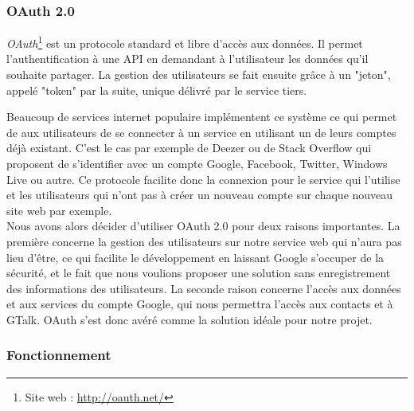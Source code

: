\subsubsection{OAuth 2.0}

\textit{OAuth}\footnote{Site web : \href{http://oauth.net/}{http://oauth.net/}} est un protocole standard et libre d'accès aux données.
Il permet l'authentification à une API en demandant à l'utilisateur les données qu'il souhaite partager.
La gestion des utilisateurs se fait ensuite grâce à un "jeton", appelé "token" par la suite, unique délivré par le service tiers.

Beaucoup de services internet populaire implémentent ce système ce qui permet de aux utilisateurs de se connecter à un service en utilisant un de leurs comptes déjà existant.
C'est le cas par exemple de Deezer ou de Stack Overflow qui proposent de s'identifier avec un compte Google, Facebook, Twitter, Windows Live ou autre.
Ce protocole facilite donc la connexion pour le service qui l'utilise et les utilisateurs qui n'ont pas 
à créer un nouveau compte sur chaque nouveau site web par exemple.
\\


Nous avons alors décider d'utiliser OAuth 2.0 pour deux raisons importantes.
La première concerne la gestion des utilisateurs sur notre service web qui n'aura pas lieu d'être, ce qui facilite le développement en laissant Google s'occuper de la sécurité, et le fait que nous voulions proposer une solution sans enregistrement des informations des utilisateurs.
La seconde raison concerne l'accès aux données et aux services du compte Google, qui nous permettra l'accès aux contacts et à GTalk.
OAuth s'est donc avéré comme la solution idéale pour notre projet.


\subsubsection{Fonctionnement}

